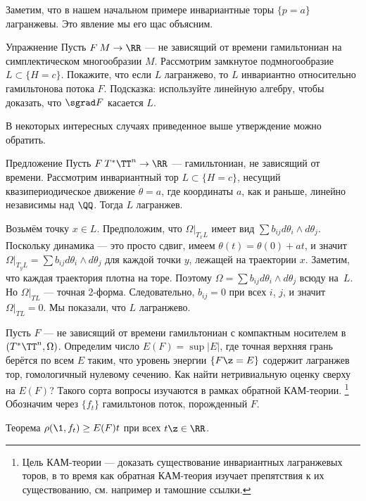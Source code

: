 Заметим, что в нашем начальном примере инвариантные торы $\{p = a\}$ лагранжевы.
Это явление мы его щас объясним.

\begin{thm}{Упражнение}\label{8.1.А}
Пусть $F\: M \to \RR$ --- не зависящий от времени гамильтониан на симплектическом многообразии $M$.
Рассмотрим замкнутое подмногообразие $L \subset \{H = c\}$.
Покажите, что если $L$ лагранжево, то $L$ инвариантно относительно гамильтонова потока $F$.
Подсказка: используйте линейную алгебру, чтобы доказать, что $\sgrad F$ касается $L$.
\end{thm}

В некоторых интересных случаях приведенное выше утверждение можно обратить.

\begin{thm}[(\cite{He})]{Предложение}\label{8.1.B}
Пусть $F\: T^\ast \TT^n \to \RR$ --- гамильтониан, не зависящий от времени.
Рассмотрим инвариантный тор $L \subset \{H = c\}$, несущий
квазипериодическое движение $\dot\theta = a$, где координаты $a$, как и раньше, линейно независимы над $\QQ$.
Тогда $L$ лагранжев.
\end{thm}

Возьмём точку $x \in L$.
Предположим, что $\Omega|_{T_x L}$ имеет вид $\sum b_{ij} d\theta_i \wedge d\theta_j$.
Поскольку динамика --- это просто сдвиг, имеем $\theta (t) = \theta (0) + at$, и значит $\Omega|_{T_y L} = \sum b_{ij} d\theta_i \wedge d\theta_j$ для каждой точки $y$, лежащей на траектории $x$.
Заметим, что каждая траектория плотна на торе.
Поэтому $\Omega = \sum b_{ij} d\theta_i \wedge d\theta_j$ всюду на~$L$.
Но $\Omega|_{TL}$ --- точная 2-форма.
Следовательно, $b_{ij} = 0$ при всех $i$, $j$, и значит $\Omega|_{T L} = 0$. 
Мы показали, что $L$ лагранжево.
\qeds

Пусть $F$ --- не зависящий от времени гамильтониан с компактным носителем в $(T^\ast \TT^n, \Omega)$.
Определим число $E (F) = \sup | E |$, где точная верхняя грань берётся по всем $E$ таким, что уровень энергии $\{F \z= E\}$ содержит лагранжев тор, гомологичный нулевому сечению.
Как найти нетривиальную оценку сверху на $E (F)$?
Такого сорта вопросы изучаются в рамках обратной КАМ-теории.%
\footnote{Цель КАМ-теории --- доказать существование инвариантных лагранжевых торов, в то время как обратная КАМ-теория изучает препятствия к их существованию, см. например \cite{Mac} и тамошние ссылки.}
Обозначим через $\{f_t\}$ гамильтонов поток, порожденный $F$.

\begin{thm}{Теорема}\label{8.1.C}
$\rho (\1, f_t) \ge E (F) t$ при всех $t \z\in \RR$.
\end{thm}

